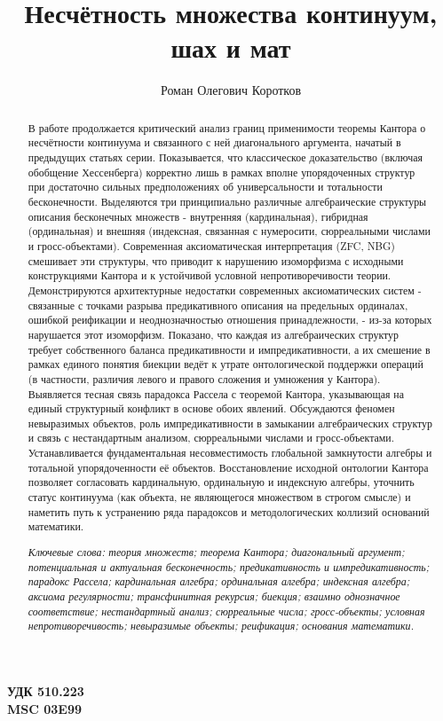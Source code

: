 \documentclass[12pt]{article}
\title{Несчётность множества континуум, шах и мат}
\author{Роман Олегович Коротков}
\begin{document}
 

\begin{flushleft}
{\bf УДК 510.223 }\\{\bf MSC 03E99 }
\end{flushleft}

{\let\newpage\relax\maketitle}

\begin{abstract}

В работе продолжается критический анализ границ применимости теоремы Кантора о несчётности континуума и связанного с ней диагонального аргумента, начатый в предыдущих статьях серии. Показывается, что классическое доказательство (включая обобщение Хессенберга) корректно лишь в рамках вполне упорядоченных структур при достаточно сильных предположениях об универсальности и тотальности бесконечности. Выделяются три принципиально различные алгебраические структуры описания бесконечных множеств - внутренняя (кардинальная), гибридная (ординальная) и внешняя (индексная, связанная с нумеросити, сюрреальными числами и гросс-объектами). Современная аксиоматическая интерпретация (ZFC, NBG) смешивает эти структуры, что приводит к нарушению изоморфизма с исходными конструкциями Кантора и к устойчивой условной непротиворечивости теории. Демонстрируются архитектурные недостатки современных аксиоматических систем - связанные с точками разрыва предикативного описания на предельных ординалах, ошибкой реификации и неоднозначностью отношения принадлежности, - из-за которых нарушается этот изоморфизм. Показано, что каждая из алгебраических структур требует собственного баланса предикативности и импредикативности, а их смешение в рамках единого понятия биекции ведёт к утрате онтологической поддержки операций (в частности, различия левого и правого сложения и умножения у Кантора). Выявляется тесная связь парадокса Рассела с теоремой Кантора, указывающая на единый структурный конфликт в основе обоих явлений. Обсуждаются феномен невыразимых объектов, роль импредикативности в замыкании алгебраических структур и связь с нестандартным анализом, сюрреальными числами и гросс-объектами. Устанавливается фундаментальная несовместимость глобальной замкнутости алгебры и тотальной упорядоченности её объектов. Восстановление исходной онтологии Кантора позволяет согласовать кардинальную, ординальную и индексную алгебры, уточнить статус континуума (как объекта, не являющегося множеством в строгом смысле) и наметить путь к устранению ряда парадоксов и методологических коллизий оснований математики.

{\it Ключевые слова: теория множеств; теорема Кантора; диагональный аргумент; потенциальная и актуальная бесконечность; предикативность и импредикативность; парадокс Рассела; кардинальная алгебра; ординальная алгебра; индексная алгебра; аксиома регулярности; трансфинитная рекурсия; биекция; взаимно однозначное соответствие; нестандартный анализ; сюрреальные числа; гросс-объекты; условная непротиворечивость; невыразимые объекты; реификация; основания математики.}

\end{abstract}
\end{document}
